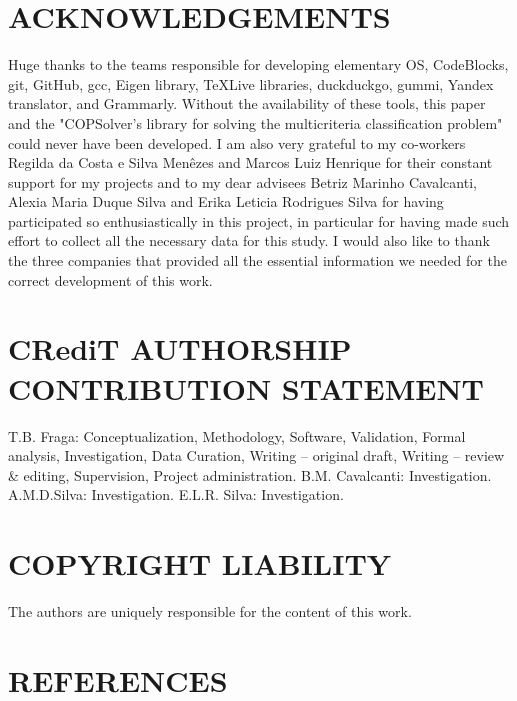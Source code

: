 \documentclass[10pt,fleqn,a4paper,twoside]{article}
\begin{document}
    \section{ACKNOWLEDGEMENTS}
    
Huge thanks to the teams responsible for developing elementary OS, CodeBlocks, git, GitHub, gcc, Eigen library, TeXLive libraries, duckduckgo, gummi, Yandex translator, and Grammarly. Without the availability of these tools, this paper and the "COPSolver's library for solving the multicriteria classification problem" could never have been developed. I am also very grateful to my co-workers Regilda da Costa e Silva Menêzes and Marcos Luiz Henrique for their constant support for my projects and to my dear advisees Betriz Marinho Cavalcanti, Alexia Maria Duque Silva and Erika Leticia Rodrigues Silva for having participated so enthusiastically in this project, in particular for having made such effort to collect all the necessary data for this study. I would also like to thank the three companies that provided all the essential information we needed for the correct development of this work. \\
        
        \section{CRediT AUTHORSHIP CONTRIBUTION STATEMENT} 
		\label{sec:contributions}

		T.B. Fraga: Conceptualization, Methodology, Software, Validation, Formal analysis, Investigation, Data Curation, Writing – original draft, Writing – review \& editing, Supervision, Project administration. B.M. Cavalcanti: Investigation. A.M.D.Silva: Investigation. E.L.R. Silva: Investigation. 

    \section{COPYRIGHT LIABILITY}
    
        The authors are uniquely responsible for the content of this work.
        
    \section{REFERENCES}
    
        
\end{document}
